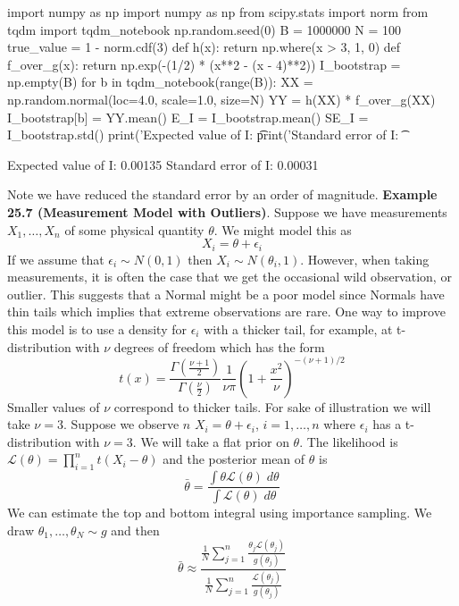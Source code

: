 \begin{python}
import numpy as np
import numpy as np
from scipy.stats import norm
from tqdm import tqdm_notebook
np.random.seed(0)
B = 1000000
N = 100
true_value = 1 - norm.cdf(3)
def h(x):
    return np.where(x > 3, 1, 0)
def f_over_g(x):
    return np.exp(-(1/2) * (x**2 - (x - 4)**2))
I_bootstrap = np.empty(B)
for b in tqdm_notebook(range(B)):
    XX = np.random.normal(loc=4.0, scale=1.0, size=N)
    YY = h(XX) * f_over_g(XX)
    I_bootstrap[b] = YY.mean()
E_I = I_bootstrap.mean()
SE_I = I_bootstrap.std()
print('Expected value of I: \t %
print('Standard error of I: \t %
\end{python}
\begin{console}
Expected value of I:     0.00135
Standard error of I:     0.00031
\end{console}
Note we have reduced the standard error by an order of magnitude.
\textbf{Example 25.7 (Measurement Model with Outliers)}. Suppose we have
measurements \(X_{1}, \dots, X_{n}\) of some physical quantity \(\theta\).
We might model this as
\[
X_{i} = \theta + \epsilon_{i}
\]
If we assume that \(\epsilon_{i} \sim N(0, 1)\) then
\(X_{i} \sim N(\theta_{i}, 1)\). However, when taking measurements, it is
often the case that we get the occasional wild observation, or outlier.
This suggests that a Normal might be a poor model since Normals have
thin tails which implies that extreme observations are rare. One way to
improve this model is to use a density for \(\epsilon_{i}\) with a thicker
tail, for example, at t-distribution with \(\nu\) degrees of freedom
which has the form
\[
t(x) = \frac{\Gamma\left( \frac{\nu + 1}{2} \right)}{\Gamma \left( \frac{\nu}{2} \right)} \frac{1}{\nu \pi} \left( 1 + \frac{x^{2}}{\nu} \right)^{-(\nu + 1) / 2}
\]
Smaller values of \(\nu\) correspond to thicker tails. For sake of
illustration we will take \(\nu = 3\). Suppose we observe \(n\)
\(X_{i} = \theta + \epsilon_{i}\), \(i = 1, \dots, n\) where \(\epsilon_{i}\)
has a t-distribution with \(\nu = 3\). We will take a flat prior on
\(\theta\). The likelihood is
\(\mathcal{L}(\theta) = \prod_{i=1}^{n} t(X_{i} - \theta)\) and the
posterior mean of \(\theta\) is
\[
\bar{\theta} = \frac{\int \theta \mathcal{L}(\theta) \; d\theta }{\int \mathcal{L}(\theta) \; d\theta}
\]
We can estimate the top and bottom integral using importance sampling.
We draw \(\theta_{1}, \dots, \theta_N \sim g\) and then
\[
\bar{\theta} \approx \frac{ \frac{1}{N} \sum_{j=1}^{n} \frac{\theta_{j} \mathcal{L}(\theta_{j})}{g(\theta_{j})}}{\frac{1}{N} \sum_{j=1}^{n} \frac{\mathcal{L}(\theta_{j})}{g(\theta_{j})}}
\]


